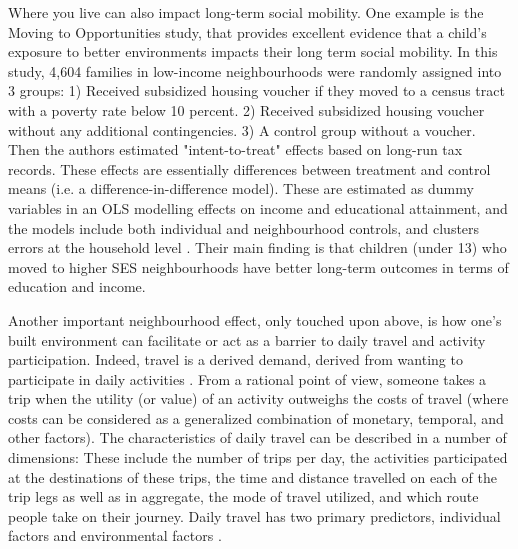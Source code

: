 Where you live can also impact long-term social mobility. One example is the Moving to Opportunities study, that provides excellent evidence that a child's exposure to better environments impacts their long term social mobility. In this study, 4,604 families in low-income neighbourhoods were randomly assigned into 3 groups: 1) Received subsidized housing voucher if they moved to a census tract with a poverty rate below 10 percent. 2) Received subsidized housing voucher without any additional contingencies. 3) A control group without a voucher. Then the authors estimated "intent-to-treat" effects based on long-run tax records. These effects are essentially differences between treatment and control means (i.e. a difference-in-difference model). These are estimated as dummy variables in an OLS modelling effects on income and educational attainment, and the models include both individual and neighbourhood controls, and clusters errors at the household level \cite{chetty_effects_2016}. Their main finding is that children (under 13) who moved to higher SES neighbourhoods have better long-term outcomes in terms of education and income.


Another important neighbourhood effect, only touched upon above, is how one's built environment can facilitate or act as a barrier to daily travel and activity participation. Indeed, travel is a derived demand, derived from wanting to participate in daily activities \cite{jones_behavioural_1979,buliung_activitytravel_2007}. From a rational point of view, someone takes a trip when the utility (or value) of an activity outweighs the costs of travel (where costs can be considered as a generalized combination of monetary, temporal, and other factors). The characteristics of daily travel can be described in a number of dimensions: These include the number of trips per day, the activities participated at the destinations of these trips, the time and distance travelled on each of the trip legs as well as in aggregate, the mode of travel utilized, and which route people take on their journey. Daily travel has two primary predictors, individual factors and environmental factors \cite{hanson_determinants_1982}. 

